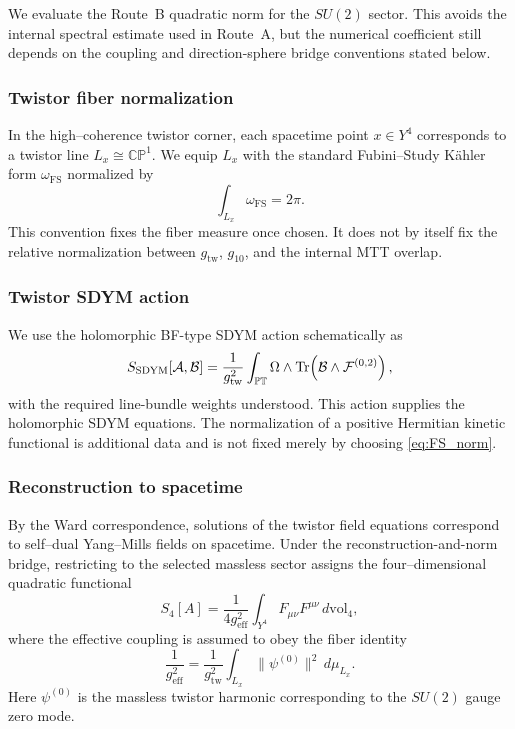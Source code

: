 \documentclass[11pt]{article}
\begin{document}
We evaluate the Route~B quadratic norm for the $SU(2)$ sector. This avoids the
internal spectral estimate used in Route~A, but the numerical coefficient still
depends on the coupling and direction-sphere bridge conventions stated below.

\subsubsection{Twistor fiber normalization}

In the high--coherence twistor corner, each spacetime point $x\in Y^4$
corresponds to a twistor line $L_x\cong\mathbb{CP}^1$.
We equip $L_x$ with the standard Fubini--Study K\"ahler form
$\omega_{\mathrm{FS}}$ normalized by
\begin{equation}
\int_{L_x}\omega_{\mathrm{FS}} = 2\pi.
\label{eq:FS_norm}
\end{equation}
This convention fixes the fiber measure once chosen. It does not by itself
fix the relative normalization between $g_{\mathrm{tw}}$, $g_{10}$, and the
internal MTT overlap.

\subsubsection{Twistor SDYM action}

We use the holomorphic BF-type SDYM action schematically as
\begin{equation}
S_{\mathrm{SDYM}}[{\cal A},{\cal B}]
=
\frac{1}{g_{\mathrm{tw}}^2}
\int_{\mathbb{PT}}
\Omega\wedge\mathrm{Tr}\!\left(
{\cal B}\wedge{\cal F}^{(0,2)}
\right),
\label{eq:twistor_action_SU2}
\end{equation}
with the required line-bundle weights understood. This action supplies the
holomorphic SDYM equations. The normalization of a positive Hermitian kinetic
functional is additional data and is not fixed merely by choosing
\eqref{eq:FS_norm}.

\subsubsection{Reconstruction to spacetime}

By the Ward correspondence, solutions of the twistor field equations correspond
to self--dual Yang--Mills fields on spacetime.
Under the reconstruction-and-norm bridge, restricting to the selected
massless sector assigns the four--dimensional quadratic functional
\begin{equation}
S_{4}[A]
=
\frac{1}{4g_{\mathrm{eff}}^2}
\int_{Y^4} F_{\mu\nu}F^{\mu\nu}\,d\mathrm{vol}_4,
\label{eq:4d_SU2}
\end{equation}
where the effective coupling is assumed to obey the fiber identity
\begin{equation}
\frac{1}{g_{\mathrm{eff}}^2}
=
\frac{1}{g_{\mathrm{tw}}^2}
\int_{L_x}
\|\psi^{(0)}\|^2\,d\mu_{L_x}.
\label{eq:SU2_fiber_norm}
\end{equation}
Here $\psi^{(0)}$ is the massless twistor harmonic corresponding to the
$SU(2)$ gauge zero mode.
\end{document}
